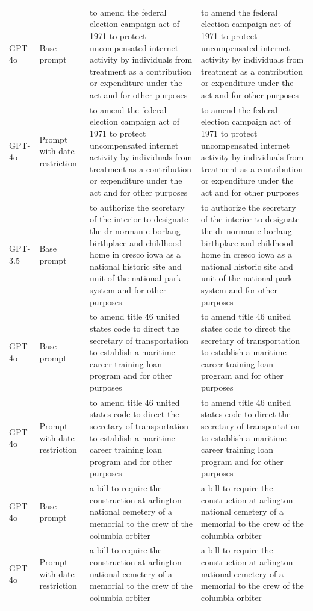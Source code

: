 \begin{longtable}{>{\raggedright\arraybackslash}p{1.4cm}>{\raggedright\arraybackslash}p{1.4cm}>{\raggedright\arraybackslash}p{5.5cm}>{\raggedright\arraybackslash}p{5.5cm}}
GPT-4o & Base prompt & to amend the federal election campaign act of 1971 to protect uncompensated internet activity by individuals from treatment as a contribution or expenditure under the act and for other purposes & to amend the federal election campaign act of 1971 to protect uncompensated internet activity by individuals from treatment as a contribution or expenditure under the act and for other purposes\\
GPT-4o & Prompt with date restriction & to amend the federal election campaign act of 1971 to protect uncompensated internet activity by individuals from treatment as a contribution or expenditure under the act and for other purposes & to amend the federal election campaign act of 1971 to protect uncompensated internet activity by individuals from treatment as a contribution or expenditure under the act and for other purposes\\
GPT-3.5 & Base prompt & to authorize the secretary of the interior to designate the dr norman e borlaug birthplace and childhood home in cresco iowa as a national historic site and unit of the national park system and for other purposes & to authorize the secretary of the interior to designate the dr norman e borlaug birthplace and childhood home in cresco iowa as a national historic site and unit of the national park system and for other purposes\\
GPT-4o & Base prompt & to amend title 46 united states code to direct the secretary of transportation to establish a maritime career training loan program and for other purposes & to amend title 46 united states code to direct the secretary of transportation to establish a maritime career training loan program and for other purposes\\
GPT-4o & Prompt with date restriction & to amend title 46 united states code to direct the secretary of transportation to establish a maritime career training loan program and for other purposes & to amend title 46 united states code to direct the secretary of transportation to establish a maritime career training loan program and for other purposes\\
GPT-4o & Base prompt & a bill to require the construction at arlington national cemetery of a memorial to the crew of the columbia orbiter & a bill to require the construction at arlington national cemetery of a memorial to the crew of the columbia orbiter\\
GPT-4o & Prompt with date restriction & a bill to require the construction at arlington national cemetery of a memorial to the crew of the columbia orbiter & a bill to require the construction at arlington national cemetery of a memorial to the crew of the columbia orbiter\\

\end{longtable}
